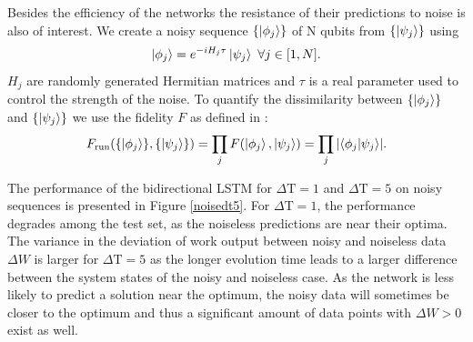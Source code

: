 Besides the efficiency of the networks the resistance of their predictions to noise is also of interest.
We create a noisy sequence $\{\ket{\phi_j}\}$ of N qubits from $\{\ket{\psi_j}\}$ using
\begin{align*}
	\ket{\phi_j} = e^{-i H_j \tau} \ket{\psi_j} \ \forall j \in [1, N].
\end{align*}
$H_j$ are randomly generated Hermitian matrices and $\tau$ is a real parameter used to control the strength of the noise.
To quantify the dissimilarity between $\{\ket{\phi_j}\}$ and $\{\ket{\psi_j}\}$ we use the fidelity $F$ as defined in \cite{10.5555/1972505}:
\begin{align*}
	F_{\text{run}}(\{\ket{\phi_j}\}, \{\ket{\psi_j}\}) = \prod_j F(\ket{\phi_j}, \ket{\psi_j}) = \prod_j \abs{\bra{\phi_j}\ket{\psi_j}}.
\end{align*}

The performance of the bidirectional LSTM for $\Delta \mathrm{T} = 1$ and $\Delta \mathrm{T} = 5$ on noisy sequences is presented in Figure \ref{noisedt5}.
For $\Delta \mathrm{T} = 1$, the performance degrades among the test set, as the noiseless predictions are near their optima.
The variance in the deviation of work output between noisy and noiseless data $\Delta W$ is larger for $\Delta \mathrm{T} = 5$ as the longer evolution time leads to a larger difference between the system states of the noisy and noiseless case.
As the network is less likely to predict a solution near the optimum, the noisy data will sometimes be closer to the optimum and thus a significant amount of data points with $\Delta W > 0$ exist as well.

